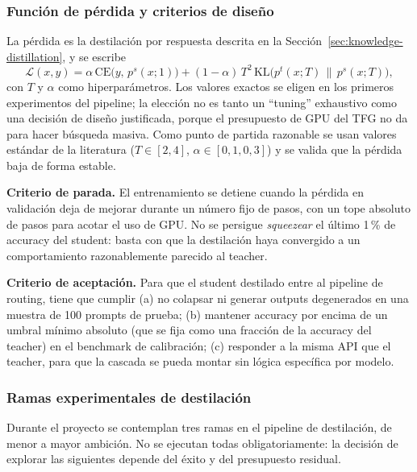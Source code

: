 \subsubsection{Función de pérdida y criterios de diseño}

La pérdida es la destilación por respuesta descrita en la Sección~\ref{sec:knowledge-distillation}, y se escribe
\[
\mathcal{L}(x, y) = \alpha \, \mathrm{CE}\!\big(y,\, p^s(x;1)\big) + (1-\alpha)\, T^2 \, \mathrm{KL}\!\big(p^t(x;T)\,\|\,p^s(x;T)\big),
\]
con $T$ y $\alpha$ como hiperparámetros. Los valores exactos se eligen en los primeros experimentos del pipeline; la elección no es tanto un ``tuning'' exhaustivo como una decisión de diseño justificada, porque el presupuesto de GPU del TFG no da para hacer búsqueda masiva. Como punto de partida razonable se usan valores estándar de la literatura ($T\in[2, 4]$, $\alpha\in[0{,}1, 0{,}3]$) y se valida que la pérdida baja de forma estable.

\textbf{Criterio de parada.} El entrenamiento se detiene cuando la pérdida en validación deja de mejorar durante un número fijo de pasos, con un tope absoluto de pasos para acotar el uso de GPU. No se persigue \textit{squeezear} el último 1\,\% de accuracy del student: basta con que la destilación haya convergido a un comportamiento razonablemente parecido al teacher.

\textbf{Criterio de aceptación.} Para que el student destilado entre al pipeline de routing, tiene que cumplir (a) no colapsar ni generar outputs degenerados en una muestra de 100 prompts de prueba; (b) mantener accuracy por encima de un umbral mínimo absoluto (que se fija como una fracción de la accuracy del teacher) en el benchmark de calibración; (c) responder a la misma API que el teacher, para que la cascada se pueda montar sin lógica específica por modelo.

\subsubsection{Ramas experimentales de destilación}

Durante el proyecto se contemplan tres ramas en el pipeline de destilación, de menor a mayor ambición. No se ejecutan todas obligatoriamente: la decisión de explorar las siguientes depende del éxito y del presupuesto residual.

